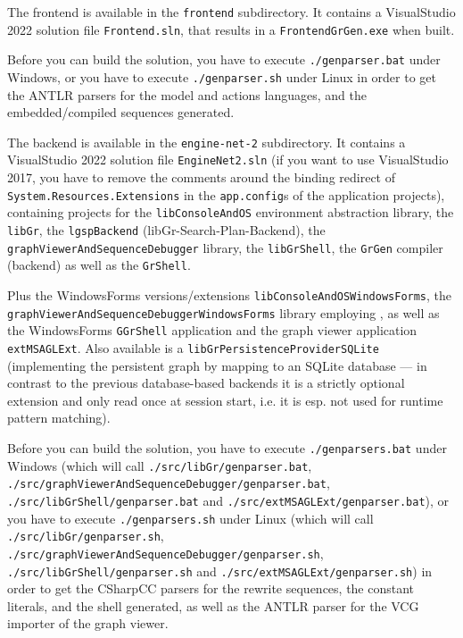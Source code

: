 The frontend is available in the \texttt{frontend} subdirectory.
It contains a VisualStudio 2022 solution file \texttt{Frontend.sln}, that results in a \texttt{FrontendGrGen.exe} when built.

Before you can build the solution, you have to execute \texttt{./gen\-parser.bat} under Windows, or you have to execute \texttt{./gen\-parser.sh} under Linux in order to get the ANTLR parsers for the model and actions languages, and the embedded/compiled sequences generated.

The backend is available in the \texttt{engine-net-2} subdirectory. 
It contains a VisualStudio 2022 solution file \texttt{EngineNet2.sln} (if you want to use VisualStudio 2017, you have to remove the comments around the binding redirect of \texttt{System.Resources.Extensions} in the \texttt{app.config}s of the application projects), containing projects for the \texttt{lib\-Console\-And\-OS} environment abstraction library, the \texttt{libGr}, the \texttt{lgspBackend} (libGr-Search-Plan-Backend), the \texttt{graph\-Viewer\-And\-Sequence\-Debugger} library, the \texttt{lib\-Gr\-Shell}, the \texttt{GrGen} compiler (backend) as well as the \texttt{GrShell}.

Plus the WindowsForms versions/extensions \texttt{lib\-Console\-And\-OS\-Windows\-Forms}, the \texttt{graph\-Viewer\-And\-Sequence\-Debugger\-Windows\-Forms} library employing \MSAGL{}, as well as the WindowsForms \texttt{GGrShell} application and the graph viewer application \texttt{extMSAGLExt}.
Also available is a \texttt{lib\-Gr\-Persistence\-Provider\-SQLite} (implementing the persistent graph by mapping to an SQLite database --- in contrast to the previous database-based backends it is a strictly optional extension and only read once at session start, i.e. it is esp. not used for runtime pattern matching).

Before you can build the solution, you have to execute \texttt{./gen\-parsers.bat} under Windows (which will call \texttt{./src/lib\-Gr/gen\-parser.bat}, \texttt{./src/graph\-Viewer\-And\-Sequence\-Debugger/gen\-parser.bat}, \texttt{./src/lib\-Gr\-Shell/gen\-parser.bat} and \texttt{./src/ext\-MSAGL\-Ext/gen\-parser.bat}), or you have to execute \texttt{./gen\-parsers.sh} under Linux (which will call \texttt{./src/lib\-Gr/gen\-parser.sh}, \texttt{./src/graph\-Viewer\-And\-Sequence\-Debugger/gen\-parser.sh}, \texttt{./src/lib\-Gr\-Shell/gen\-parser.sh} and \texttt{./src/ext\-MSAGL\-Ext/gen\-parser.sh}) in order to get the CSharpCC parsers for the rewrite sequences, the constant literals, and the shell generated, as well as the ANTLR parser for the VCG importer of the \extMSAGLExt{} graph viewer.

